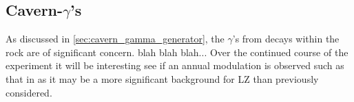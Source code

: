 \subsection{Cavern-$\gamma$'s}
\par
As discussed in \autoref{sec:cavern_gamma_generator}, the $\gamma$'s from decays within the rock are of significant concern.
blah blah blah...
Over the continued course of the experiment it will be interesting see if an annual modulation is observed such as that in \cite{cavern_gamma_annual_modulation_CoGeNT_ref, cavern_gammas_in_Soudan_mine_ref} as it may be a more significant background for LZ than previously considered.